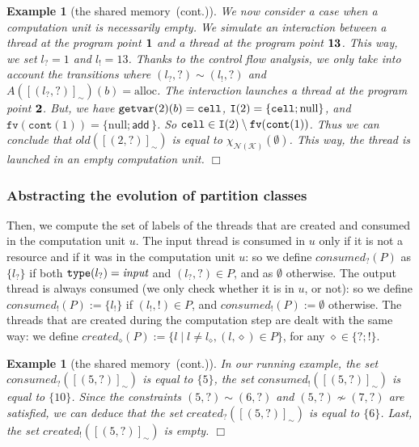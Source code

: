 \documentclass{article}
\newcommand{\bydef}{:=}
\newcommand{\boxexample}{$\Box$}
\newtheorem{example}[thm]{Example}
\newcommand{\rec}{?}
\newcommand{\eme}{!}
\newcommand{\pp}[1]{$\bf{#1}$}
\newcommand{\globalname}[1]{\mathrm{#1}}
\newcommand{\internal}[1]{\textnormal{\texttt{#1}}}
\newcommand{\data}[1]{\textsf{#1}\,}
\newcommand{\addinit}{\data{add}}
\newcommand{\ccreate}{\globalname{alloc}}
\newcommand{\cnull}{\globalname{null}}
\newcommand{\ccell}{\internal{cell}}
\newcommand{\memlaba}{1}
\newcommand{\memlabb}{2}
\newcommand{\memlabe}{5}
\newcommand{\memlabf}{6}
\newcommand{\memlabg}{7}
\newcommand{\memlabj}{10}
\newcommand{\memlabm}{13}
\newcommand{\FN}{\texttt{fv}}
\newcommand{\interface}{\mathtt{I}}
\newcommand{\type}{\texttt{type}}
\newcommand{\inputm}{\emph{input}}
\newcommand{\cont}{\texttt{cont}}
\newcommand{\lrec}{l_{\rec}}
\newcommand{\leme}{l_{\eme}}
\newcommand{\continued}{(cont.)}
\newcommand{\giveindex}{\texttt{getvar}}
\newcommand{\shareanalysis}{the shared memory}
\newcommand{\var}{\mathcal{K}}
\newcommand{\abstnum}{\mathcal{N}(\var)}
\newcommand{\xinum}{\chi_{\abstnum}}
\newcommand{\ccontentanalysis}{\shareanalysis\ \continued}
\begin{document}
\begin{example}[\ccontentanalysis]
We now consider a case when  a computation unit is necessarily empty.
We simulate an interaction between a thread at the program point
\pp{\memlaba} and a thread at the program point \pp{\memlabm}.
This way, we set $\lrec=\memlaba$ and $\leme=\memlabm$.
Thanks to the control flow analysis, we only take into account the transitions where $(\lrec,\rec)\sim(\leme,\rec)$  and $A([(\lrec,\rec)]_\sim)(b)=\ccreate$. 
The interaction launches a thread at the program point \pp{\memlabb}.
But, we have  $\giveindex(\memlabb)(b)=\ccell$, $\interface(\memlabb)=\{\ccell;\cnull\}$, and $\FN(\cont(\memlaba))=\{\cnull;\addinit\}$.
So $\ccell\in \interface(\memlabb)\setminus \FN(\cont(\memlaba))$.
Thus we can conclude that $\textit{old}([(\memlabb,\rec)]_\sim)$ is equal to $\xinum(\emptyset)$. This way, the thread is launched in an empty computation unit.
\boxexample\end{example}



\subsubsection{Abstracting the evolution of partition classes}

Then, we compute the set of labels of the threads that are created and consumed in the computation unit $u$.
The input thread is consumed in $u$ only if it is not a resource and if it was in the computation unit $u$: so we define $\textit{consumed}_{\rec}(P)$ as $\{l_\rec\}$ if both  $\type(l_\rec)=\inputm$  and $(l_\rec,\rec)\in P$, and as 
  $\emptyset$ otherwise. The output thread is always consumed (we only check whether it is in $u$, or not): so we define $\textit{consumed}_{\eme}(P)\bydef\{l_\eme\}$ if $(l_\eme,\eme)\in P$, and 
 $\textit{consumed}_{\eme}(P)\bydef\emptyset$ otherwise. The threads that are created during the computation step are dealt with the same way: we define $\textit{created}_{\diamond}(P)\bydef\{l\;|\;l\not=l_{\diamond}, (l,\diamond)\in P\}$, for any $\diamond\in\{\rec;\eme\}$. 

\begin{example}[\ccontentanalysis]
In our running example, the set 
$\textit{consumed}_{\rec}([(\memlabe,\rec)]_\sim)$ is equal to $\{\memlabe\}$, the set $\textit{consumed}_{\eme}([(\memlabe,\rec)]_\sim)$ is equal to $\{\memlabj\}$. Since the constraints $(\memlabe,\rec)\sim (\memlabf,\rec)$ and $(\memlabe,\rec)\not \sim (\memlabg,\rec)$ are satisfied, we can deduce that the set $\textit{created}_{\rec}([(\memlabe,\rec)]_\sim)$ is equal to $\{\memlabf\}$. Last, the set 
  $\textit{created}_{\eme}([(\memlabe,\rec)]_\sim)$ is empty.
\boxexample\end{example}
\end{document}
